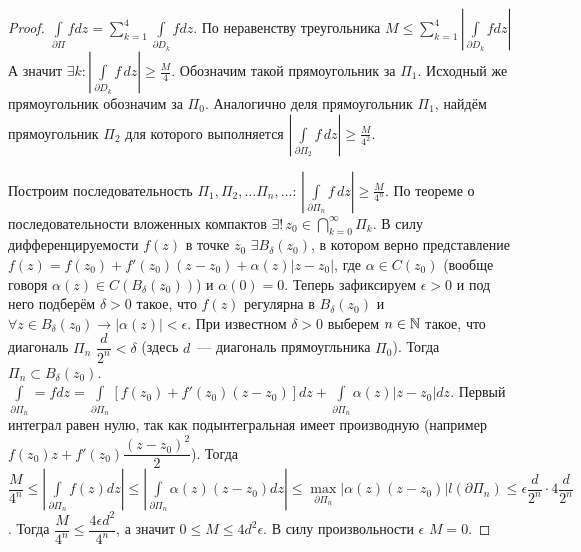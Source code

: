 \begin{proof}
\begin{minipage}[c]{0.28\textwidth}
\end{minipage}%
\hfill
\begin{minipage}[c]{0.70\textwidth}
    \(\int\limits_{\partial\Pi} fdz = \sum_{k=1}^{4} \int\limits_{\partial D_k} fdz.\)
    По неравенству треугольника \(M \le \sum_{k=1}^{4} \left|\int\limits_{\partial D_k} fdz\right|\)
    А значит \(\exists k : \left| \int\limits_{\partial D_k} f\,dz \right| \ge \frac{M}{4}.\)
    Обозначим такой прямоугольник за \(\Pi_1\). Исходный же прямоугольник обозначим за \(\Pi_0\).
    Аналогично деля прямоугольник \(\Pi_1\), найдём прямоугольник \(\Pi_2\) для которого выполняется
    \( \left| \int\limits_{\partial \Pi_2} f\,dz \right| \ge \frac{M}{4^2}\).
\end{minipage}
    Построим последовательность \(\Pi_1, \Pi_2, \dots \Pi_n, \dots \colon \, \left| 
    \int\limits_{\partial \Pi_n} f\,dz \right| \ge \frac{M}{4^n}\). По теореме о последовательности 
    вложенных компактов \(\exists ! \, z_0 \in \bigcap\limits_{k=0}^\infty \Pi_k\). В силу 
    дифференцируемости \(f(z)\) в точке \(z_0\) \(\exists B_\delta (z_0)\), в котором верно
    представление \(f(z) = f(z_0) + f'(z_0)(z-z_0) + \alpha(z)|z-z_0|\), где \(\alpha \in C(z_0)\)
    (вообще говоря \(\alpha(z) \in C(B_\delta(z_0))\)) и \(\alpha(0) = 0\). Теперь зафиксируем 
    \(\epsilon > 0\) и под него подберём \(\delta > 0\) такое, что \(f(z)\) регулярна в \(B_\delta
    (z_0)\) и \(\forall z \in B_\delta(z_0) \rightarrow |\alpha(z)| < \epsilon\). При известном
    \(\delta > 0\) выберем \(n \in \mathbb{N}\) такое, что диагональ \(\Pi_n\) \(\dfrac{d}{2^n} < \delta\) 
    (здесь \(d\)~--- диагональ прямоугльника \(\Pi_0\)). Тогда \(\Pi_n \subset B_\delta (z_0)\).
    \(\int\limits_{\partial \Pi_n} = f dz = \int\limits_{\partial \Pi_n} [f(z_0) + f'(z_0)(z-z_0)]
    dz + \int\limits_{\partial \Pi_n} \alpha(z)|z-z_0|dz\). Первый интеграл равен нулю, так как 
    подынтегральная имеет производную (например \(f(z_0)z + f'(z_0)\dfrac{(z-z_0)^2}{2}\)).
    Тогда \(\dfrac{M}{4^n} \le \left|\int\limits_{\partial \Pi_n} f(z) dz\right| \le 
    \left|\int\limits_{\partial \Pi_n} \alpha(z)(z-z_0)dz\right| \le \max\limits_{\partial \Pi_n}
    |\alpha(z)(z-z_0)| l(\partial \Pi_n) \le \epsilon \dfrac{d}{2^n} \cdot 4 \dfrac{d}{2^n}\).
    Тогда \(\dfrac{M}{4^n} \le \dfrac{4\epsilon d^2}{4^n}\), а значит \(0 \le M \le 4d^2\epsilon\).
    В силу произвольности \(\epsilon\) \(M = 0\).
\end{proof}



